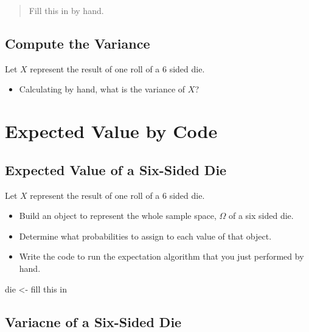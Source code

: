 \documentclass[
]{book}
\newenvironment{Shaded}{\begin{snugshade}}{\end{snugshade}}
\newcommand{\NormalTok}[1]{#1}
\newcommand{\OtherTok}[1]{\textcolor[rgb]{0.56,0.35,0.01}{#1}}
\newcommand{\StringTok}[1]{\textcolor[rgb]{0.31,0.60,0.02}{#1}}
\providecommand{\tightlist}{%
  \setlength{\itemsep}{0pt}\setlength{\parskip}{0pt}}
\theoremstyle{definition}
\theoremstyle{definition}
\theoremstyle{definition}
\theoremstyle{definition}
\theoremstyle{remark}
\begin{document}
\begin{quote}
Fill this in by hand.
\end{quote}

\hypertarget{compute-the-variance}{%
\subsection{Compute the Variance}\label{compute-the-variance}}

Let \(X\) represent the result of one roll of a 6 sided die.

\begin{itemize}
\tightlist
\item
  Calculating by hand, what is the variance of \(X\)?
\end{itemize}

\hypertarget{expected-value-by-code}{%
\section{Expected Value by Code}\label{expected-value-by-code}}

\hypertarget{expected-value-of-a-six-sided-die}{%
\subsection{Expected Value of a Six-Sided Die}\label{expected-value-of-a-six-sided-die}}

Let \(X\) represent the result of one roll of a 6 sided die.

\begin{itemize}
\tightlist
\item
  Build an object to represent the whole sample space, \(\Omega\) of a six sided die.
\item
  Determine what probabilities to assign to each value of that object.
\item
  Write the code to run the expectation algorithm that you just performed by hand.
\end{itemize}

\begin{Shaded}
\begin{Highlighting}[]
\NormalTok{die }\OtherTok{\textless{}{-}} \StringTok{\textquotesingle{}fill this in\textquotesingle{}} 
\end{Highlighting}
\end{Shaded}

\hypertarget{variacne-of-a-six-sided-die}{%
\subsection{Variacne of a Six-Sided Die}\label{variacne-of-a-six-sided-die}}
\end{document}
